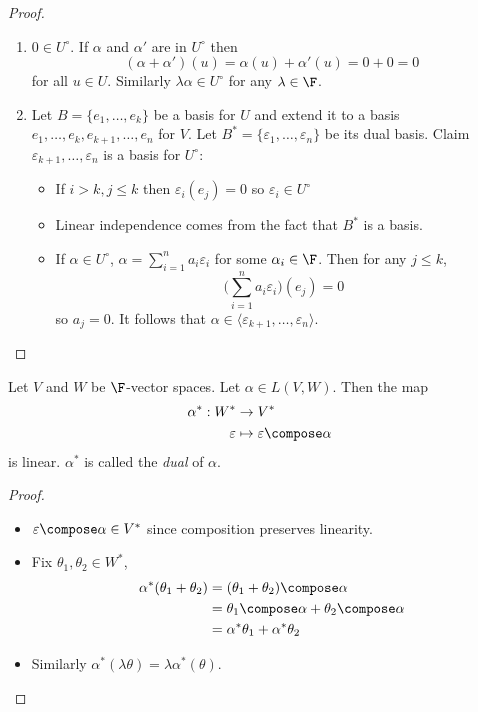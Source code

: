 \documentclass[a4paper]{article}
\newcommand*{\ann}{\circ}
\theoremstyle{definition}
\begin{document}
\begin{proof}\leavevmode
  \begin{enumerate}
  \item \(0 \in U^\ann\). If \(\alpha\) and \(\alpha'\) are in \(U^\ann\) then
    \[
      (\alpha+ \alpha')(u) = \alpha(u) + \alpha'(u) = 0+0 = 0
    \]
    for all \(u\in U\). Similarly \(\lambda\alpha\in U^\ann\) for any \(\lambda \in \F\).
  \item Let \(B = \{e_1,\dots, e_k\}\) be a basis for \(U\) and extend it to a basis \(e_1,\dots,e_k,e_{k+1},\dots,e_n\) for \(V\). Let \(B^*=\{\varepsilon_1,\dots,\varepsilon_n\}\) be its dual basis. Claim \(\varepsilon_{k+1},\dots,\varepsilon_n \) is a basis for \(U^\ann\):
    \begin{itemize}
    \item If \(i>k,j\leq k\) then \(\varepsilon_i(e_j) = 0 \) so \(\varepsilon_i\in U^\ann\)
    \item Linear independence comes from the fact that \(B^*\) is a basis.
    \item If \(\alpha\in U^\ann\), \(\alpha = \sum_{i=1}^na_i\varepsilon_i\) for some \(\alpha_i\in \F\). Then for any \(j\leq k\),
      \[
        \Big( \sum_{i=1}^{n}a_i\varepsilon_i \Big) (e_j) = 0
      \]
      so \(a_j=0\). It follows that \(\alpha \in \langle \varepsilon_{k+1},\dots,\varepsilon_n \rangle\).
    \end{itemize}
  \end{enumerate}
\end{proof}

\begin{lem}
  Let \(V\) and \(W\) be \(\F\)-vector spaces. Let \(\alpha \in L(V,W)\). Then the map
  \begin{align*}
    \alpha^*: W^* &\to V^* \\
    \varepsilon &\mapsto \varepsilon \compose \alpha
  \end{align*}
  is linear. \(\alpha^*\) is called the \emph{dual} of \(\alpha\).
\end{lem}

\begin{proof}\leavevmode
  \begin{itemize}
  \item \(\varepsilon \compose \alpha \in V^*\) since composition preserves linearity.
  \item Fix \(\theta_1,\theta_2\in W^*\),
    \begin{align*}
      \alpha^*(\theta_1+\theta_2) &= (\theta_1+\theta_2)\compose \alpha \\
                                  &= \theta_1\compose \alpha + \theta_2 \compose \alpha \\
      &= \alpha^*\theta_1 + \alpha^*\theta_2
    \end{align*}
  \item Similarly \(\alpha^*(\lambda\theta) = \lambda\alpha^*(\theta)\).
  \end{itemize}
\end{proof}
\end{document}
